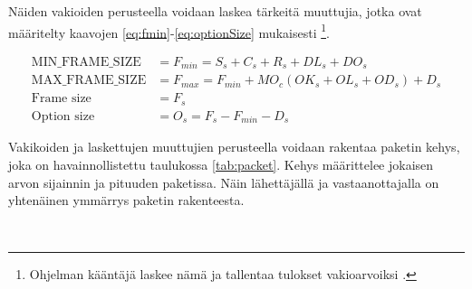 \documentclass[a4paper,12pt]{article}
\begin{document}
    Näiden vakioiden perusteella voidaan laskea tärkeitä muuttujia, jotka ovat määritelty kaavojen \ref{eq:fmin}-\ref{eq:optionSize} mukaisesti \footnote{Ohjelman kääntäjä laskee nämä ja tallentaa tulokset vakioarvoiksi \cite{rust_book_constant_evaluation}.}.

    \begin{align}
        \text{MIN\_FRAME\_SIZE} &= F_{min} = S_s + C_s + R_s + DL_s + DO_s \label{eq:fmin} \\
        \text{MAX\_FRAME\_SIZE} &= F_{max} = F_{min} + MO_c(OK_s + OL_s + OD_s) + D_s \label{eq:fmax} \\
        \text{Frame size} &= F_s \\
        \text{Option size} &= O_s = F_s - F_{min} - D_s \label{eq:optionSize}
    \end{align}

    Vakikoiden ja laskettujen muuttujien perusteella voidaan rakentaa paketin kehys, joka on havainnollistettu taulukossa \ref{tab:packet}.
    Kehys määrittelee jokaisen arvon sijainnin ja pituuden paketissa. Näin lähettäjällä ja vastaanottajalla on yhtenäinen ymmärrys paketin rakenteesta.

    \begin{table}[h!]
        \
        \centering
        \caption{Paketin rakenne}
        \label{tab:packet}
    \end{table}
\end{document}
